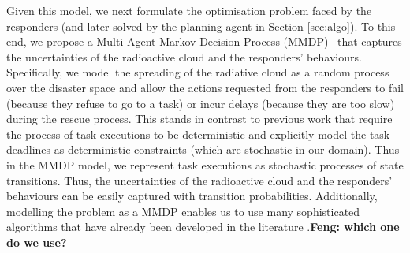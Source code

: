 Given this model, we next formulate the optimisation problem faced by the responders (and later solved by the planning agent in Section \ref{sec:algo}). To this end, we propose a Multi-Agent Markov Decision Process (MMDP)~\cite{?} that captures the uncertainties of the radioactive cloud and the responders' behaviours. Specifically, we model the spreading of the radiative cloud as a random process over the disaster space and allow the actions requested from the responders to  fail (because they refuse to go to a  task) or incur delays (because they are too slow) during the rescue process. This stands in contrast to previous work \cite{csftp,HTSSC} that require the process of task executions to be deterministic and explicitly model the task deadlines as deterministic constraints (which are stochastic in our domain). Thus in the MMDP model, we represent  task executions as stochastic processes of state transitions. Thus, the uncertainties of the radioactive cloud and the responders' behaviours can be easily captured with transition probabilities. Additionally, modelling the problem as a MMDP enables us to use many sophisticated algorithms that have already been developed in the literature \cite{XX,YY,ZZ}.\textbf{Feng: which one do we use?}



